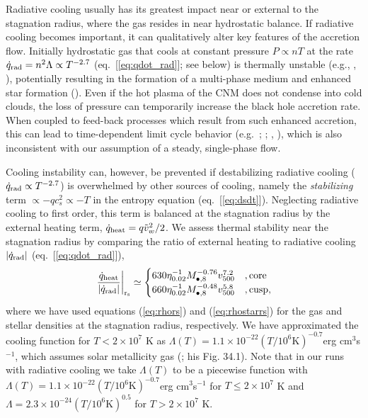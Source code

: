 \documentclass[usenatbib,fleqn]{mn2e}
\begin{document}
Radiative cooling usually has its greatest impact near or external to
the stagnation radius, where the gas resides in near hydrostatic
balance.  If radiative cooling becomes important, it can qualitatively
alter key features of the accretion flow. Initially hydrostatic gas
that cools at constant pressure $P \propto nT$ at the rate
$\dot{q}_{\rm rad} = n^{2}\Lambda \propto T^{-2.7}$
(eq.~[\ref{eq:qdot_rad}]; see below) is thermally unstable
(e.g., \citealt{McCourt+12}, \citealt{Li&Bryan14a}), potentially resulting
in the formation of a multi-phase medium and enhanced star formation (\citealt{Li&Bryan14b}).
Even if the hot plasma of the CNM does not condense into cold clouds,
the loss of pressure can temporarily increase the black hole accretion
rate.  When coupled to feed-back processes which result from such enhanced accretion, this can lead to
time-dependent limit cycle behavior
(e.g.~\citealt{Ciotti&Ostriker07}; \citealt{Ciotti+10};
\citealt{Yuan&Li11}, \citealt{Gan+14}), which is also inconsistent
with our assumption of a steady, single-phase flow.

Cooling instability can, however, be prevented if destabilizing radiative cooling ($\dot{q}_{\rm rad} \propto T^{-2.7}$) is overwhelmed by
other sources of cooling, namely the {\it stabilizing} term $\propto -q c_{s}^{2}
\propto -T$ in the entropy equation (eq.~[\ref{eq:dsdt}]).
Neglecting radiative cooling to first order, this term is balanced at the stagnation
radius by the external heating term, $\dot{q}_{\rm heat} = q
\tilde{v}_{w}^{2}/2$.  We assess thermal stability near the stagnation radius by comparing the ratio of external heating to
radiative cooling $|\dot{q}_{\rm rad}|$ (eq.~[\ref{eq:qdot_rad}]),
\begin{align}
\left.\frac{\dot{q}_{\rm heat}}{|\dot{q}_{\rm rad}|}\right|_{\rm r_{\rm s}} \simeq
  \begin{cases}
   630 \eta_{0.02}^{-1} M_{\bullet,8}^{-0.76}v_{500}^{7.2}  &, \text{core}\\
   660 \eta_{0.02}^{-1} M_{\bullet,8}^{-0.48}v_{500}^{5.8}  &, \text{cusp},     
  \end{cases}
  \label{eq:cooling2}
\end{align}
where we have used equations (\ref{eq:rhors}) and (\ref{eq:rhostarrs})
for the gas and stellar densities at the stagnation radius,
respectively.  We have approximated the cooling function for $T <
2\times 10^{7}$ K as $\Lambda(T) = 1.1 \times 10^{-22} \left(T/10^6
  \text{K}\right)^{-0.7} $erg cm$^3 $s$^{-1}$, which assumes solar
metallicity gas (\citealt{Draine:2011a}; his Fig. 34.1).  Note that in
our runs with radiative cooling we take $\Lambda(T)$ to be a piecewise
function with $\Lambda(T) = 1.1 \times 10^{-22} \left(T/10^6
  \text{K}\right)^{-0.7} $erg cm$^3 $s$^{-1}$ for $T\leq 2\times
10^{7}$ K and $\Lambda = 2.3 \times 10^{-24} \left(T/10^6
  \text{K}\right)^{0.5}$ for $T>2\times 10^{7}$ K.
\end{document}
